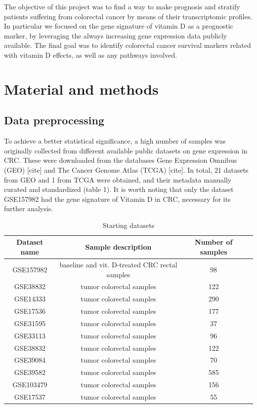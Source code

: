 \documentclass[fleqn,10pt]{SelfArx} %
\begin{document}
The objective of this project was to find a way to make prognosis and stratify patients suffering from colorectal cancer by means of their transcriptomic profiles. In particular we focused on the gene signature of vitamin D as a prognostic marker, by leveraging the always increasing gene expression data publicly available. The final goal was to identify colorectal cancer survival markers related with vitamin D effects, as well as any pathways involved.


\section{Material and methods}

	\subsection{Data preprocessing}
	To achieve a better statistical significance, a high number of samples was originally collected from different available public datasets on gene expression in CRC. These were downloaded from the databases Gene Expression Omnibus (GEO) [cite] and The Cancer Genome Atlas (TCGA) [cite]. In total, 21 datasets from GEO and 1 from TCGA were obtained, and their metadata manually curated and standardized (table 1). It is worth noting that only the dataset GSE157982 had the gene signature of Vitamin D in CRC, necessary for its further analysis.

	\begin{table}[ht]
		\centering
		\begin{tabular}{cccc}
			\hline
			Dataset name & Sample description & Number of samples\\
			\hline
			GSE157982	&baseline and vit. D-treated CRC rectal samples	&98\\
			GSE38832	&tumor colorectal samples	&122\\
			GSE14333	&tumor colorectal samples	&290\\
			GSE17536	&tumor colorectal samples	&177\\
			GSE31595	&tumor colorectal samples	&37	\\
			GSE33113	&tumor colorectal samples	&96	\\
			GSE38832	&tumor colorectal samples	&122\\
			GSE39084	&tumor colorectal samples	&70	\\
			GSE39582	&tumor colorectal samples	&585\\
			GSE103479	&tumor colorectal samples	&156\\
			GSE17537	&tumor colorectal samples	&55	\\
			\hline
		\end{tabular}
		\caption{Starting datasets}
		\label{tab:datasets}
	\end{table}
\end{document}
